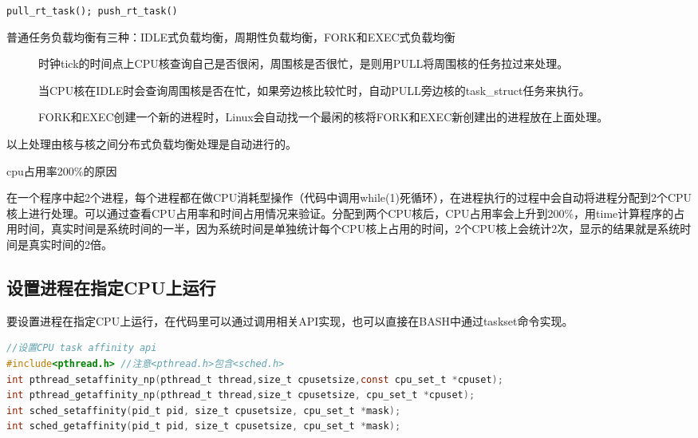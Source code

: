 \verb|pull_rt_task(); push_rt_task()|

普通任务负载均衡有三种：IDLE式负载均衡，周期性负载均衡，FORK和EXEC式负载均衡

\begin{description}
  \item[] 时钟tick的时间点上CPU核查询自己是否很闲，周围核是否很忙，是则用PULL将周围核的任务拉过来处理。
  \item[] 当CPU核在IDLE时会查询周围核是否在忙，如果旁边核比较忙时，自动PULL旁边核的task\_struct任务来执行。
  \item[] FORK和EXEC创建一个新的进程时，Linux会自动找一个最闲的核将FORK和EXEC新创建出的进程放在上面处理。
\end{description}
以上处理由核与核之间分布式负载均衡处理是自动进行的。

\begin{example*}
  \wdexpbox
  {\caption{cpu占用率200\%的原因}}
  {在一个程序中起2个进程，每个进程都在做CPU消耗型操作（代码中调用while(1)死循环），在进程执行的过程中会自动将进程分配到2个CPU核上进行处理。可以通过查看CPU占用率和时间占用情况来验证。分配到两个CPU核后，CPU占用率会上升到200\%，用time计算程序的占用时间，真实时间是系统时间的一半，因为系统时间是单独统计每个CPU核上占用的时间，2个CPU核上会统计2次，显示的结果就是系统时间是真实时间的2倍。}
\end{example*}

\subsection{设置进程在指定CPU上运行}
要设置进程在指定CPU上运行，在代码里可以通过调用相关API实现，也可以直接在BASH中通过taskset命令实现。
\begin{lstlisting}[language={C}]
//设置CPU task affinity api
#include<pthread.h> //注意<pthread.h>包含<sched.h>
int pthread_setaffinity_np(pthread_t thread,size_t cpusetsize,const cpu_set_t *cpuset);
int pthread_getaffinity_np(pthread_t thread,size_t cpusetsize, cpu_set_t *cpuset);
int sched_setaffinity(pid_t pid, size_t cpusetsize, cpu_set_t *mask);
int sched_getaffinity(pid_t pid, size_t cpusetsize, cpu_set_t *mask);
\end{lstlisting}

